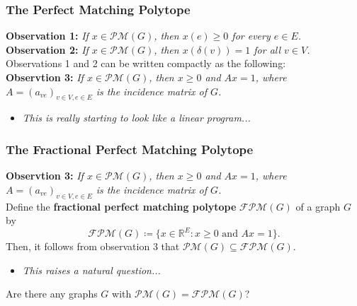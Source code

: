 \begin{frame}
\frametitle{The Perfect Matching Polytope}
\textbf{Observation 1:} \emph{If \( x \in \mathcal{P} \mathcal{M} (G) \), then \( x(e) \geq 0 \) for every \( e \in E \).} \\
\vspace{0.1cm}
\textbf{Observation 2:} \emph{If \( x \in \mathcal{P} \mathcal{M} (G) \), then \( x(\delta (v)) = 1 \) for all \( v \in V \).}\\
\vspace{0.5cm}
Observations 1 and 2 can be written compactly as the following: \pause \\
\vspace{0.1cm}
\textbf{Observtion 3:} \emph{If \( x \in \mathcal{P} \mathcal{M} (G) \), then \( x \geq 0 \) and \( Ax = 1 \), where \( A = (a_{ve})_{v \in V, e \in E}  \) is the incidence matrix of \( G \).}
\begin{itemize}
	\item<3> \emph{This is really starting to look like a linear program...} 
\end{itemize}
\end{frame}

\begin{frame}
\frametitle{The Fractional Perfect Matching Polytope}
\textbf{Observtion 3:} \emph{If \( x \in \mathcal{P} \mathcal{M} (G) \), then \( x \geq 0 \) and \( Ax = 1 \), where \( A = (a_{ve})_{v \in V, e \in E}  \) is the incidence matrix of \( G \).}\\
\vspace{0.3cm}
Define the \textbf{fractional perfect matching polytope} \( \mathcal{F} \mathcal{P}\mathcal{M} (G)  \) of a graph \( G \) by \pause \[ \mathcal{FPM}(G) \coloneqq \{ x \in \mathbb{R}^{E} : x \geq 0 \mbox{ and } Ax = 1 \}.   \] \pause Then, it follows from observation 3 that \( \mathcal{PM} (G) \subseteq \mathcal{FPM} (G) \).
\begin{itemize}
	\item<2> \emph{This raises a natural question...} 
	
\end{itemize}
\end{frame}

\begin{frame}
\begin{center}
\Large Are there any graphs \( G \) with \( \mathcal{PM} (G) = \mathcal{FPM} (G) \)?
\end{center}
\end{frame}

